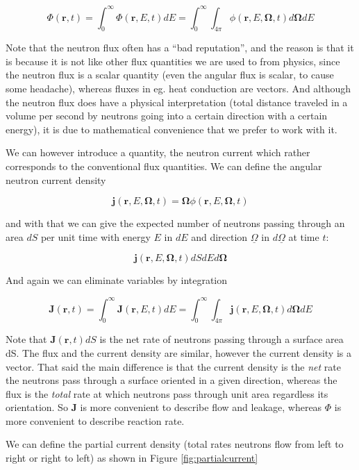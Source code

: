 $$\Phi(\mathbf{r},t)=\int^\infty_0\Phi(\mathbf{r},E,t)dE=\int^\infty_0\int_{4\pi}\phi(\mathbf{r},E,\mathbf{\Omega},t)d\mathbf{\Omega}dE$$

Note that the neutron flux often has a ``bad reputation'', and the reason is that it is because it is not like other flux quantities we are used to from physics, since the neutron flux is a scalar quantity (even the angular flux is scalar, to cause some headache), whereas fluxes in eg. heat conduction are vectors. And although the neutron flux does have a physical interpretation (total distance traveled in a volume per second by neutrons going into a certain direction with a certain energy), it is due to mathematical convenience that we prefer to work with it. 

We can however introduce a quantity, the neutron current which rather corresponds to the conventional flux quantities. We can define the angular neutron current density

\begin{equation}
\mathbf{j}(\mathbf{r},E,\mathbf{\Omega},t)=\mathbf{\Omega}\phi(\mathbf{r},E,\mathbf{\Omega},t)
\end{equation}

\noindent and with that we can give the expected number of neutrons passing through an area $dS$ per unit time with energy $E$ in $dE$ and direction $\underline\Omega$ in $d\underline\Omega$ at time $t$:

$$\mathbf{j}(\mathbf{r},E,\mathbf{\Omega},t)dSdEd\mathbf{\Omega}$$

And again we can eliminate variables by integration

$$\mathbf{J}(\mathbf{r},t)=\int^\infty_0\mathbf{J}(\mathbf{r},E,t)dE=\int^\infty_0\int_{4\pi}\mathbf{j}(\mathbf{r},E,\mathbf{\Omega},t)d\mathbf{\Omega}dE$$

Note that $\mathbf{J}(\mathbf{r},t)dS$ is the net rate of neutrons passing through a surface area dS. The flux and the current density are similar, however the current density is a vector. That said the main difference is that the current density is the \textit{net} rate the neutrons pass through a surface oriented in a given direction, whereas the flux is the \textit{total} rate at which neutrons pass through unit area regardless its orientation. So $\mathbf{J}$ is more convenient to describe flow and leakage, whereas $\Phi$ is more convenient to describe reaction rate.

We can define the partial current density (total rates neutrons flow from left to right or right to left) as shown in Figure \ref{fig:partialcurrent}

